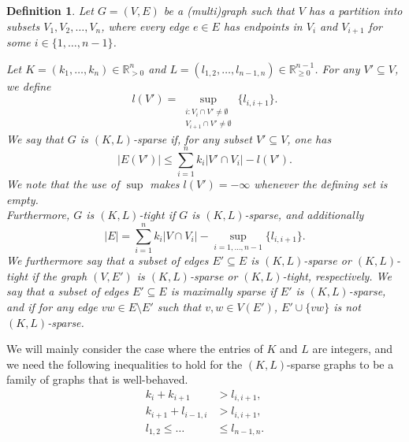 \documentclass[10pt,a4paper]{article}
\newtheorem{definition}[theorem]{Definition}
\begin{document}
\begin{definition}\label{KL-sparse}
    Let $G=(V,E)$ be a (multi)graph such that $V$ has a partition into subsets $V_1, V_2, \dots, V_n$, where every edge $e\in E$ has endpoints in $V_i$  and $V_{i+1}$ for some $i\in \{1,\dots, n-1\}$.
    
       Let $K=(k_1,\dots, k_n)\in \mathbb{R}_{>0}^{n}$ and ${L=(l_{1,2}, \dots , l_{n-1, n}) \in \mathbb{R}_{\geq 0}^{n-1}}$. For any $V'\subseteq V$, we define
    \begin{equation*}
        l(V') = \underset{\substack{
       i: V_{i}\cap V'\neq \emptyset\\ 
       V_{i+1}\cap V'\neq \emptyset}}
       {\sup} \{l_{i,i+1}\}.
    \end{equation*}
    We say that $G$ is $(K,L)$-sparse if, for any subset $V' \subseteq V$, one has
    \begin{equation*}
       \vert E(V')\vert \leq \sum_{i=1}^{n} k_i\vert V' \cap V_i\vert -l(V').
    \end{equation*}
    We note that the use of $\sup$ makes $l(V')=-\infty$ whenever the defining set is empty.\\ 
    Furthermore, $G$ is $(K,L)$-tight if $G$ is $(K,L)$-sparse, and additionally
        \begin{equation*}
       \vert E\vert = \sum_{i=1}^{n} k_i\vert V \cap V_i\vert -\sup_{i=1,\dots, n-1} \{l_{i,i+1}\}.
    \end{equation*}
    We furthermore say that a subset of edges $E'\subseteq E$ is $(K, L)$-sparse or $(K, L)$-tight if the graph $(V, E')$ is $(K,L)$-sparse or $(K,L)$-tight, respectively.  We say that a subset of edges $E'\subseteq E$ is maximally sparse if $E'$ is $(K,L)$-sparse, and if for any edge $vw \in E \setminus E'$ such that $v,w \in V(E')$, $E'\cup \{vw\}$ is not $(K,L)$-sparse.
\end{definition}

We will mainly consider the case where the entries of $K$ and $L$ are integers, and we need the following inequalities to hold for the $(K,L)$-sparse graphs to be a family of graphs that is well-behaved. 
\begin{align}
    k_i + k_{i+1} &> l_{i, i+1} \label{conditionposet1 -k k l},\\
    k_{i+1} + l_{i-1, i} &> l_{i, i+1}\label{conditionposet2 - k l l},\\
     l_{1,2} \leq  \dots &\leq l_{n-1,n}. \label{conditionposet3-increasing}
\end{align}
\end{document}
